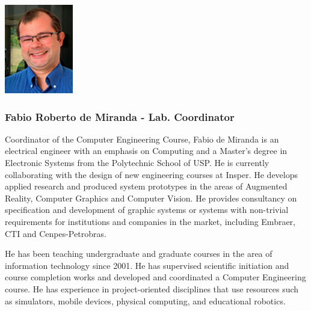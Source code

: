 \begin{multicols}{2}
\includegraphics[width=3cm]{imgs/fabio-miranda.jpg}
\columnbreak
\subsubsection{Fabio Roberto de Miranda - Lab. Coordinator}

Coordinator of the Computer Engineering Course, Fabio de Miranda is an electrical engineer with an emphasis on Computing and a Master's degree in Electronic Systems from the Polytechnic School of USP. He is currently collaborating with the design of new engineering courses at Insper.
He develops applied research and produced system prototypes in the areas of Augmented Reality, Computer Graphics and Computer Vision. He provides consultancy on specification and development of graphic systems or systems with non-trivial requirements for institutions and companies in the market, including Embraer, CTI and Cenpes-Petrobras.

He has been teaching undergraduate and graduate courses in the area of information technology since 2001. He has supervised scientific initiation and course completion works and developed and coordinated a Computer Engineering course. He has experience in project-oriented disciplines that use resources such as simulators, mobile devices, physical computing, and educational robotics.

\end{multicols}

